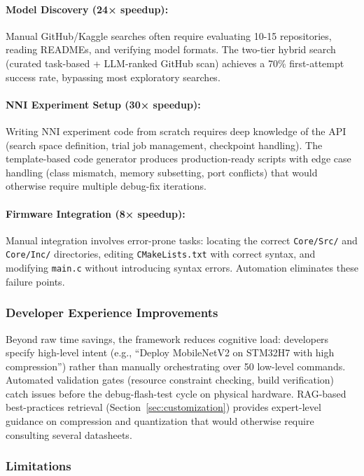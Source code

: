 \paragraph{Model Discovery (24× speedup):} Manual GitHub/Kaggle searches often require evaluating 10-15 repositories, reading READMEs, and verifying model formats. The two-tier hybrid search (curated task-based + LLM-ranked GitHub scan) achieves a 70\% first-attempt success rate, bypassing most exploratory searches.

\paragraph{NNI Experiment Setup (30× speedup):} Writing NNI experiment code from scratch requires deep knowledge of the API (search space definition, trial job management, checkpoint handling). The template-based code generator produces production-ready scripts with edge case handling (class mismatch, memory subsetting, port conflicts) that would otherwise require multiple debug-fix iterations.

\paragraph{Firmware Integration (8× speedup):} Manual integration involves error-prone tasks: locating the correct \texttt{Core/Src/} and \texttt{Core/Inc/} directories, editing \texttt{CMakeLists.txt} with correct syntax, and modifying \texttt{main.c} without introducing syntax errors. Automation eliminates these failure points.

\subsubsection{Developer Experience Improvements}

Beyond raw time savings, the framework reduces cognitive load: developers specify high-level intent (e.g., ``Deploy MobileNetV2 on STM32H7 with high compression'') rather than manually orchestrating over 50 low-level commands. Automated validation gates (resource constraint checking, build verification) catch issues before the debug-flash-test cycle on physical hardware. RAG-based best-practices retrieval (Section~\ref{sec:customization}) provides expert-level guidance on compression and quantization that would otherwise require consulting several datasheets.

\subsubsection{Limitations}

